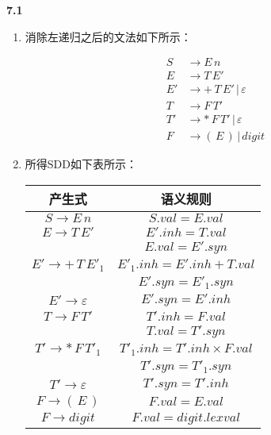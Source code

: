 \documentclass[UTF8]{report}
\newcommand{\tbf}[1]{\textbf{#1}}
\begin{document}
\pagestyle{fancy}

\maketitle

\noindent
\tbf{7.1}

\begin{enumerate}[label=(\arabic*)]
    \item 消除左递归之后的文法如下所示：
    
    \begin{align*}
        S &\to E \, n \\
        E &\to T \, E' \\
        E' &\to + \, T \, E' \, | \, \varepsilon \\
        T &\to F \, T' \\
        T' &\to * \, F \, T' \, | \, \varepsilon \\
        F &\to ( \, E \, ) \, | \, digit
    \end{align*}

    \item 所得SDD如下表所示：
    
    \begin{table}[H]
        \centering
        \begin{tabular}{|c|c|}
            \hline
            \textbf{产生式} & \textbf{语义规则} \\
            \hline
            $S \to E \, n$ & $S.val = E.val$ \\
            \hline
            $E \to T \, E'$ & $E'.inh = T.val$ \\
            & $E.val = E'.syn$ \\
            \hline
            $E' \to + \, T \, E'_1$ & $E'_1.inh = E'.inh + T.val$ \\
            & $E'.syn = E'_1.syn$ \\
            \hline
            $E' \to \varepsilon$ & $E'.syn = E'.inh$ \\
            \hline
            $T \to F \, T'$ & $T'.inh = F.val$ \\
            & $T.val = T'.syn$ \\
            \hline
            $T' \to * \, F \, T'_1$ & $T'_1.inh = T'.inh \times F.val$ \\
            & $T'.syn = T'_1.syn$ \\
            \hline
            $T' \to \varepsilon$ & $T'.syn = T'.inh$ \\
            \hline
            $F \to ( \, E \, )$ & $F.val = E.val$ \\
            \hline
            $F \to digit$ & $F.val = digit.lexval$ \\
            \hline
        \end{tabular}
    \end{table}


\end{enumerate}
\end{document}
